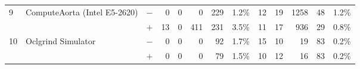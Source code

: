 \begin{tabular}{lll | rrrrr | rrrrr }
\hline
\multirow{ 2}{*}{9} & \multirow{ 2}{*}{ComputeAorta (Intel E5-2620)} & $-$ & 0 & 0 & 0 & 229 & 1.2\%       & 12 & 19 & 1258 & 48 & 1.2\% \\& & $+$ & 13 & 0 & 411 & 231 & 3.5\% & 11 & 17 & 936 & 29 & 0.8\% \\
\hline
\multirow{ 2}{*}{10} & \multirow{ 2}{*}{Oclgrind Simulator} & $-$ & 0 & 0 & 0 & 92 & 1.7\%       & 15 & 10 & 19 & 83 & 0.2\% \\& & $+$ & 0 & 0 & 0 & 79 & 1.5\% & 10 & 12 & 16 & 83 & 0.2\% \\
  \bottomrule
\end{tabular}

